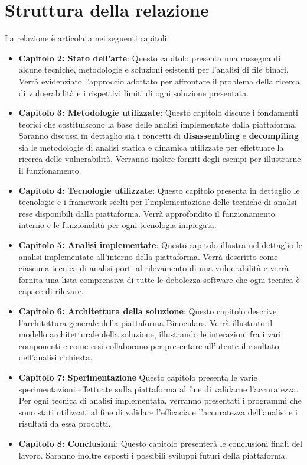 \documentclass[../main.tex]{subfiles}
\begin{document}
\section{Struttura della relazione}
La relazione è articolata nei seguenti capitoli:
\begin{itemize}
    \item \textbf{Capitolo 2: Stato dell'arte}: Questo capitolo presenta una rassegna di alcune tecniche, metodologie e soluzioni esistenti per l'analisi di file binari. Verrà evidenziato l'approccio adottato per affrontare il problema della ricerca di vulnerabilità e i
    rispettivi limiti di ogni soluzione presentata.
    \item \textbf{Capitolo 3: Metodologie utilizzate}: Questo capitolo discute i fondamenti teorici che costituiscono la base delle analisi implementate dalla piattaforma. Saranno discussi in dettaglio sia i concetti di \textbf{disassembling} e \textbf{decompiling} sia
    le metodologie di analisi statica e dinamica utilizzate per effettuare la ricerca delle vulnerabilità. Verranno inoltre forniti degli esempi per illustrarne il funzionamento.
    \item \textbf{Capitolo 4: Tecnologie utilizzate}: Questo capitolo presenta in dettaglio le tecnologie e i framework scelti per l'implementazione delle tecniche di analisi rese disponibili dalla piattaforma. Verrà approfondito il funzionamento interno e le funzionalità per ogni tecnologia impiegata.
    \item \textbf{Capitolo 5: Analisi implementate}: Questo capitolo illustra nel dettaglio le analisi implementate all'interno della piattaforma. Verrà descritto come ciascuna tecnica di analisi porti al rilevamento di una vulnerabilità e verrà fornita una lista comprensiva di tutte le debolezza software che ogni tecnica è capace di rilevare.
    \item \textbf{Capitolo 6: Architettura della soluzione}: Questo capitolo descrive l'architettura generale della piattaforma Binoculars. Verrà illustrato il modello architetturale della soluzione, illustrando le interazioni fra i vari componenti e come essi collaborano per presentare all'utente il risultato dell'analisi richiesta.   
    \item \textbf{Capitolo 7: Sperimentazione} Questo capitolo presenta le varie sperimentazioni effettuate sulla piattaforma al fine di validarne l'accuratezza. Per ogni tecnica di analisi implementata, verranno presentati i programmi che sono stati utilizzati al fine di validare l'efficacia e l'accuratezza dell'analisi e i risultati da essa prodotti.
    \item \textbf{Capitolo 8: Conclusioni}: Questo capitolo presenterà le conclusioni finali del lavoro. Saranno inoltre esposti i possibili sviluppi futuri della piattaforma.
\end{itemize}
\end{document}
